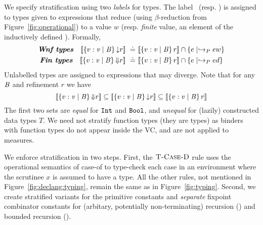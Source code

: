 We specify stratification using two \emph{labels} for types.
%
The label \trivial\ (resp. \finite) is assigned to types given 
to expressions that reduce (using $\beta$-reduction from Figure~\ref{fig:operational})  
to a value $w$ (resp. \emph{finite} value,
\ie an element of the inductively defined \dom).
%
Formally,
%
\begin{align}
  \mbox{\emphbf{\Wnf types}} \quad 
\interp{\tref{\vv}{\Base}{\trivial}{r}} \defeq & 
    \interp{\tref{\vv}{\Base}{}{r}} \cap \{ e \mid \evals{e}{w} \}
    \label{eq:trivial} \\
  \mbox{\emphbf{\Fin types}} \quad 
\interp{\tref{\vv}{\Base}{\finite}{r}} \defeq & 
    \interp{\tref{\vv}{\Base}{}{r}} \cap \{ e \mid \evals{e}{d} \} 
    \label{eq:finite} 
\end{align}
%
Unlabelled types are assigned to expressions that may diverge.
%
Note that for any $\mathit{B}$ and refinement $r$ we have
$$
[\![\left\lbrace v : \mathit{v}\mid \mathit{B}\right\rbrace{\ensuremath{\Downarrow}}{r}]\!] \subseteq
[\![\left\lbrace v : \mathit{v}\mid \mathit{B}\right\rbrace{\ensuremath{\downarrow}}{r}]\!] \subseteq
[\![\left\lbrace v : \mathit{v}\mid \mathit{B}\right\rbrace{}{r}]\!]
$$ 
%
The first two sets are \emph{equal} for $\mathtt{Int}$ and $\texttt{Bool}$, 
and \emph{unequal} for (lazily) constructed data types $T$. 
%
We need not stratify function types (\ie they are \Div types)
as binders with function types do not appear inside the VC, and 
are not applied to measures.

\label{sec:typing:termination}
%
We enforce stratification in two steps.
%
First, the $\textsc{T-Case-D}$ rule uses the operational semantics of case-of to 
type-check each case in an environment where the scrutinee
$x$ is assumed to have a \Wnf type. 
%
All the other rules, not mentioned in Figure~\ref{fig:declang:typing},
remain the same as in Figure~\ref{fig:typing}.
%
Second, we create stratified variants for the primitive constants 
and \emph{separate} fixpoint combinator constants for 
(arbitary, potentially non-terminating) recursion (\efix{}) 
and bounded recursion (\etfix{}).

